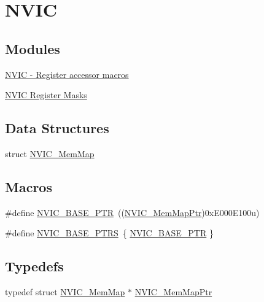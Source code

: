 \hypertarget{group___n_v_i_c___peripheral}{}\section{N\+V\+IC}
\label{group___n_v_i_c___peripheral}
\subsection*{Modules}
\begin{DoxyCompactItemize}
\item 
\hyperlink{group___n_v_i_c___register___accessor___macros}{N\+V\+I\+C -\/ Register accessor macros}
\item 
\hyperlink{group___n_v_i_c___register___masks}{N\+V\+I\+C Register Masks}
\end{DoxyCompactItemize}
\subsection*{Data Structures}
\begin{DoxyCompactItemize}
\item 
struct \hyperlink{struct_n_v_i_c___mem_map}{N\+V\+I\+C\+\_\+\+Mem\+Map}
\end{DoxyCompactItemize}
\subsection*{Macros}
\begin{DoxyCompactItemize}
\item 
\#define \hyperlink{group___n_v_i_c___peripheral_ga28f0a055d0c218e16d1fc7b13ff0caa5}{N\+V\+I\+C\+\_\+\+B\+A\+S\+E\+\_\+\+P\+TR}~((\hyperlink{group___n_v_i_c___peripheral_ga685d87c766bb24fb3330aa8cc48fa0e7}{N\+V\+I\+C\+\_\+\+Mem\+Map\+Ptr})0x\+E000\+E100u)
\item 
\#define \hyperlink{group___n_v_i_c___peripheral_ga25b6ce0c871e09199e515cbb1716fe26}{N\+V\+I\+C\+\_\+\+B\+A\+S\+E\+\_\+\+P\+T\+RS}~\{ \hyperlink{group___n_v_i_c___peripheral_ga28f0a055d0c218e16d1fc7b13ff0caa5}{N\+V\+I\+C\+\_\+\+B\+A\+S\+E\+\_\+\+P\+TR} \}
\end{DoxyCompactItemize}
\subsection*{Typedefs}
\begin{DoxyCompactItemize}
\item 
typedef struct \hyperlink{struct_n_v_i_c___mem_map}{N\+V\+I\+C\+\_\+\+Mem\+Map} $\ast$ \hyperlink{group___n_v_i_c___peripheral_ga685d87c766bb24fb3330aa8cc48fa0e7}{N\+V\+I\+C\+\_\+\+Mem\+Map\+Ptr}
\end{DoxyCompactItemize}


